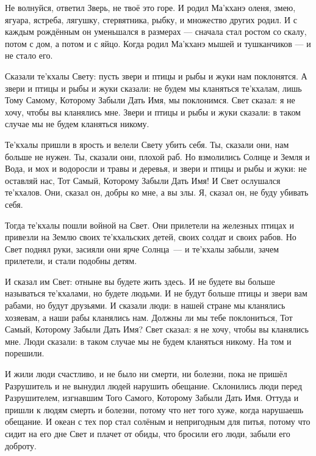 Не волнуйся, ответил Зверь, не твоё это горе.
И родил Ма'кханэ оленя, змею, ягуара, ястреба, лягушку, стервятника, рыбку, и множество других родил.
И с каждым рождённым он уменьшался в размерах --- сначала стал ростом со скалу, потом с дом, а потом и с яйцо.
Когда родил Ма'кханэ мышей и тушканчиков --- и не стало его.

Сказали те'кхалы Свету: пусть звери и птицы и рыбы и жуки нам поклонятся.
А звери и птицы и рыбы и жуки сказали: не будем мы кланяться те'кхалам, лишь Тому Самому, Которому Забыли Дать Имя, мы поклонимся.
Свет сказал: я не хочу, чтобы вы кланялись мне.
Звери и птицы и рыбы и жуки сказали: в таком случае мы не будем кланяться никому.

Те'кхалы пришли в ярость и велели Свету убить себя.
Ты, сказали они, нам больше не нужен.
Ты, сказали они, плохой раб.
Но взмолились Солнце и Земля и Вода, и мох и водоросли и травы и деревья, и звери и птицы и рыбы и жуки: не оставляй нас, Тот Самый, Которому Забыли Дать Имя!
И Свет ослушался те'кхалов.
Они, сказал он, добры ко мне, а вы злы.
Я, сказал он, не буду убивать себя.

Тогда те'кхалы пошли войной на Свет.
Они прилетели на железных птицах и привезли на Землю своих те'кхальских детей, своих солдат и своих рабов.
Но Свет поднял руки, засияли они ярче Солнца\footnotemark\ --- и те'кхалы забыли, зачем прилетели, и стали подобны детям.

И сказал им Свет: отныне вы будете жить здесь.
И не будете вы больше называться те'кхалами, но будете людьми.
И не будут больше птицы и звери вам рабами, но будут друзьями.
И сказали люди: в нашей стране мы кланялись хозяевам, а наши рабы кланялись нам.
Должны ли мы тебе поклониться, Тот Самый, Которому Забыли Дать Имя?
Свет сказал: я не хочу, чтобы вы кланялись мне.
Люди сказали: в таком случае мы не будем кланяться никому.
На том и порешили.

И жили люди счастливо, и не было ни смерти, ни болезни, пока не пришёл Разрушитель и не вынудил людей нарушить обещание.
Склонились люди перед Разрушителем, изгнавшим Того Самого, Которому Забыли Дать Имя.
Оттуда и пришли к людям смерть и болезни, потому что нет того хуже, когда нарушаешь обещание.
И океан с тех пор стал солёным и непригодным для питья, потому что сидит на его дне Свет и плачет от обиды, что бросили его люди, забыли его доброту.

